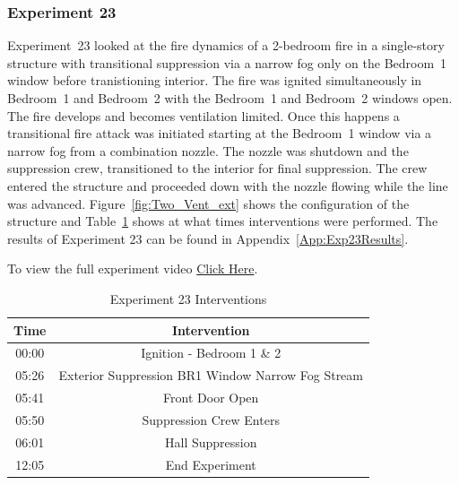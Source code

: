 \documentclass[12pt,oneside]{book}
\begin{document}
\clearpage

\subsubsection{Experiment 23}
Experiment~23 looked at the fire dynamics of a 2-bedroom fire in a single-story structure with transitional suppression via a narrow fog only on the Bedroom~1 window before tranistioning interior. The fire was ignited simultaneously in Bedroom~1 and Bedroom~2 with the Bedroom~1 and Bedroom~2 windows open. The fire develops and becomes ventilation limited. Once this happens a transitional fire attack was initiated starting at the Bedroom~1 window via a narrow fog from a combination nozzle. The nozzle was shutdown and the suppression crew, transitioned to the interior for final suppression. The crew entered the structure and proceeded down with the nozzle flowing while the line was advanced. Figure~\ref{fig:Two_Vent_ext} shows the configuration of the structure and Table~\ref{Table:Exp23Interventions} shows at what times interventions were performed. The results of Experiment 23 can be found in Appendix~\ref{App:Exp23Results}. 

To view the full experiment video \href{https://player.vimeo.com/video/170499625?autoplay=1}{Click Here}.

\begin{table}[H]
	\centering
	\caption{Experiment 23 Interventions}
	\begin{tabular}{|c|c|} 
		\hline
		Time & Intervention \\ \hline \hline
		00:00 & Ignition - Bedroom 1 \& 2 \\ \hline
		05:26 & Exterior Suppression BR1 Window Narrow Fog Stream \\ \hline
		05:41 & Front Door Open \\ \hline
		05:50 & Suppression Crew Enters\\ \hline
		06:01 & Hall Suppression \\ \hline 
		12:05 & End Experiment\\ \hline
	\end{tabular}
	\label{Table:Exp23Interventions}
\end{table}

\clearpage
\end{document}
